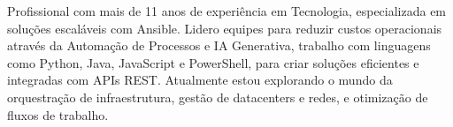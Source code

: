 

\begin{cvparagraph}

Profissional com mais de 11 anos de experiência em Tecnologia, especializada em soluções escaláveis com Ansible. Lidero equipes para reduzir custos operacionais através da Automação de Processos e IA Generativa, trabalho com linguagens como Python, Java, JavaScript e PowerShell, para criar soluções eficientes e integradas com APIs REST. Atualmente estou explorando o mundo da orquestração de infraestrutura, gestão de datacenters e redes, e otimização de fluxos de trabalho.
\end{cvparagraph}
